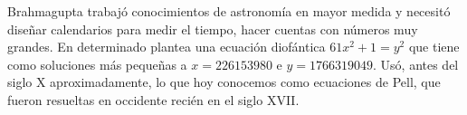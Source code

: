 Brahmagupta trabajó conocimientos de astronomía en mayor medida y necesitó diseñar calendarios para medir el tiempo, hacer cuentas con números muy grandes. En determinado plantea una ecuación diofántica $61x^2 + 1 = y^2$ que tiene como soluciones más pequeñas a $x=226153980$ e $y=1766319049$. Usó, antes del siglo X aproximadamente, lo que hoy conocemos como ecuaciones de Pell, que fueron resueltas en occidente recién en el siglo XVII.